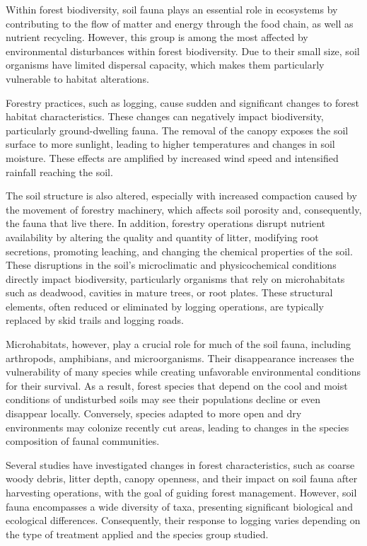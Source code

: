 %

Within forest biodiversity, soil fauna plays an essential role in ecosystems by contributing to the flow of matter and energy through the food chain, as well as nutrient recycling. 
However, this group is among the most affected by environmental disturbances within forest biodiversity. 
Due to their small size, soil organisms have limited dispersal capacity, which makes them particularly vulnerable to habitat alterations.

Forestry practices, such as logging, cause sudden and significant changes to forest habitat characteristics. 
These changes can negatively impact biodiversity, particularly ground-dwelling fauna. 
The removal of the canopy exposes the soil surface to more sunlight, leading to higher temperatures and changes in soil moisture. 
These effects are amplified by increased wind speed and intensified rainfall reaching the soil.

The soil structure is also altered, especially with increased compaction caused by the movement of forestry machinery, which affects soil porosity and, consequently, the fauna that live there. 
In addition, forestry operations disrupt nutrient availability by altering the quality and quantity of litter, modifying root secretions, promoting leaching, and changing the chemical properties of the soil. 
These disruptions in the soil's microclimatic and physicochemical conditions directly impact biodiversity, particularly organisms that rely on microhabitats such as deadwood, cavities in mature trees, or root plates. 
These structural elements, often reduced or eliminated by logging operations, are typically replaced by skid trails and logging roads.

Microhabitats, however, play a crucial role for much of the soil fauna, including arthropods, amphibians, and microorganisms. 
Their disappearance increases the vulnerability of many species while creating unfavorable environmental conditions for their survival. 
As a result, forest species that depend on the cool and moist conditions of undisturbed soils may see their populations decline or even disappear locally. 
Conversely, species adapted to more open and dry environments may colonize recently cut areas, leading to changes in the species composition of faunal communities.

Several studies have investigated changes in forest characteristics, such as coarse woody debris, litter depth, canopy openness, and their impact on soil fauna after harvesting operations, 
with the goal of guiding forest management. 
However, soil fauna encompasses a wide diversity of taxa, presenting significant biological and ecological differences. 
Consequently, their response to logging varies depending on the type of treatment applied and the species group studied.

